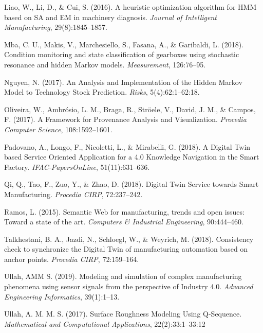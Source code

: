 \documentclass{CUP-JNL-DCE}
\begin{document}
\begin{Backmatter}
\begin{thebibliography}{}
Liao, W., Li, D., {\&} Cui, S. (2016). A heuristic optimization algorithm
for HMM based on SA and EM in machinery diagnosis. \textit{Journal of Intelligent Manufacturing}, 29(8):1845--1857.

Mba, C. U., Makis, V., Marchesiello, S., Fasana, A., {\&} Garibaldi, L.
(2018). Condition monitoring and state classification of gearboxes using
stochastic resonance and hidden Markov models. \textit{Measurement}, 126:76--95.

Nguyen, N. (2017). An Analysis and Implementation of the Hidden Markov Model
to Technology Stock Prediction. \textit{Risks}, 5(4):62:1--62:18.

Oliveira, W., Ambr\'{o}sio, L. M., Braga, R., Str\"{o}ele, V., David, J. M.,
{\&} Campos, F. (2017). A Framework for Provenance Analysis and
Visualization. \textit{Procedia Computer Science}, 108:1592--1601.

Padovano, A., Longo, F., Nicoletti, L., {\&} Mirabelli, G. (2018). A Digital
Twin based Service Oriented Application for a 4.0 Knowledge Navigation in
the Smart Factory. \textit{IFAC-PapersOnLine}, 51(11):631--636.

Qi, Q., Tao, F., Zuo, Y., {\&} Zhao, D. (2018). Digital Twin Service towards
Smart Manufacturing. \textit{Procedia CIRP}, 72:237--242.

Ramos, L. (2015). Semantic Web for manufacturing, trends and open issues:
Toward a state of the art. \textit{Computers {\&} Industrial Engineering}, 90:444--460.

Talkhestani, B. A., Jazdi, N., Schloegl, W., {\&} Weyrich, M. (2018).
Consistency check to synchronize the Digital Twin of manufacturing
automation based on anchor points. \textit{Procedia CIRP}, 72:159--164.

Ullah, AMM S. (2019). Modeling and simulation of complex manufacturing
phenomena using sensor signals from the perspective of Industry 4.0.
\textit{Advanced Engineering Informatics}, 39(1):1--13.

Ullah, A. M. M. S. (2017). Surface Roughness Modeling Using Q-Sequence.
\textit{Mathematical and Computational Applications}, 22(2):33:1--33:12


\end{thebibliography}
\end{Backmatter}
\end{document}
